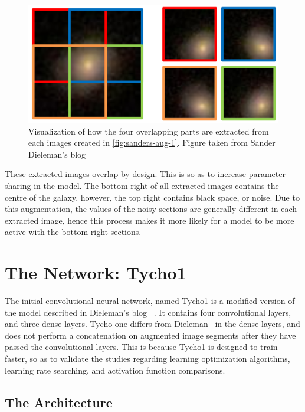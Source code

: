 \documentclass[12pt,a4paper,oneside,oldfontcommands]{memoir}
\begin{document}
\begin{Declaration Of OriginalityOrginality}
\begin{figure}[H]
  \centering
    \includegraphics[width=\linewidth]{images/sanders-aug-2.png}
    \caption{Visualization of how the four overlapping parts are extracted from each images created in \ref{fig:sanders-aug-1}. Figure taken from Sander Dieleman's blog~\cite{Sanders-GZ}}
    \label{fig:sanders-aug-2}
\end{figure}

These extracted images overlap by design. This is so as to increase parameter sharing in the model. The bottom right of all extracted images contains the centre of the galaxy, however, the top right contains black space, or noise. Due to this augmentation, the values of the noisy sections are generally different in each extracted image, hence this process makes it more likely for a model to be more active with the bottom right sections.

\chapter{The Network: Tycho1}

The initial convolutional neural network, named Tycho1 is a modified version of the model described in Dieleman's blog ~\cite{Sanders-GZ}. It contains four convolutional layers, and three dense layers. Tycho one differs from Dieleman~\cite{Sanders-GZ} in the dense layers, and does not perform a concatenation on augmented image segments after they have passed the convolutional layers. This is because Tycho1 is designed to train faster, so as to validate the studies regarding learning optimization algorithms, learning rate searching, and activation function comparisons. 

\section{The Architecture} \label{tycho1-arch}


\end{Declaration Of OriginalityOrginality}
\end{document}
